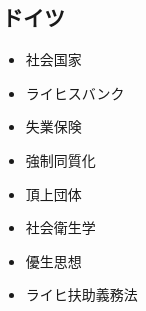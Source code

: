 \documentclass{jsarticle}
\begin{document}
\subsection{ドイツ}
\begin{itemize}
	\item 社会国家
	\item ライヒスバンク
	\item 失業保険
	\item 強制同質化
	\item 頂上団体
	\item 社会衛生学
	\item 優生思想
	\item ライヒ扶助義務法
\end{itemize}
\end{document}
